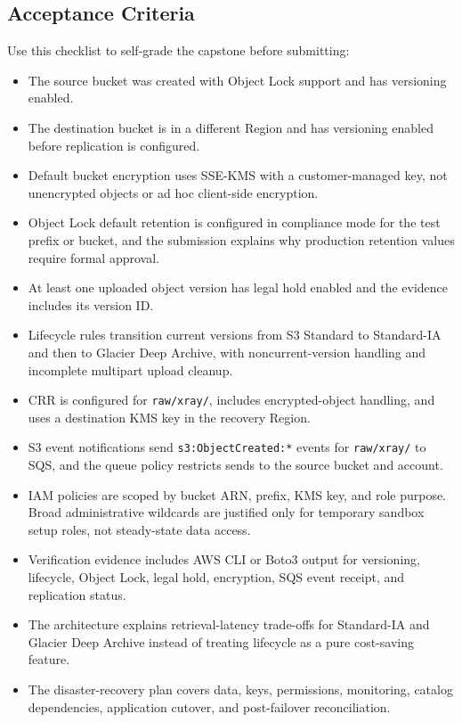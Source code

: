 \subsection*{Acceptance Criteria}
Use this checklist to self-grade the capstone before submitting:
\begin{itemize}
    \item The source bucket was created with Object Lock support and has versioning enabled.
    \item The destination bucket is in a different Region and has versioning enabled before replication is configured.
    \item Default bucket encryption uses SSE-KMS with a customer-managed key, not unencrypted objects or ad hoc client-side encryption.
    \item Object Lock default retention is configured in compliance mode for the test prefix or bucket, and the submission explains why production retention values require formal approval.
    \item At least one uploaded object version has legal hold enabled and the evidence includes its version ID.
    \item Lifecycle rules transition current versions from S3 Standard to Standard-IA and then to Glacier Deep Archive, with noncurrent-version handling and incomplete multipart upload cleanup.
    \item CRR is configured for \texttt{raw/xray/}, includes encrypted-object handling, and uses a destination KMS key in the recovery Region.
    \item S3 event notifications send \texttt{s3:ObjectCreated:*} events for \texttt{raw/xray/} to SQS, and the queue policy restricts sends to the source bucket and account.
    \item IAM policies are scoped by bucket ARN, prefix, KMS key, and role purpose. Broad administrative wildcards are justified only for temporary sandbox setup roles, not steady-state data access.
    \item Verification evidence includes AWS CLI or Boto3 output for versioning, lifecycle, Object Lock, legal hold, encryption, SQS event receipt, and replication status.
    \item The architecture explains retrieval-latency trade-offs for Standard-IA and Glacier Deep Archive instead of treating lifecycle as a pure cost-saving feature.
    \item The disaster-recovery plan covers data, keys, permissions, monitoring, catalog dependencies, application cutover, and post-failover reconciliation.
\end{itemize}

